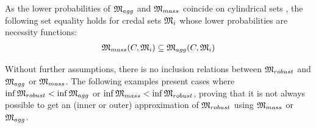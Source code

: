 As the lower probabilities of $\mathfrak{M}_{agg}$ and $\mathfrak{M}_{mass}$ coincide on cylindrical sets , the following set equality holds for credal sets $\mathfrak{M}_i$ whose lower probabilities are necessity functions:
\begin{eqnarray}\label{eq:inclusion_necessity}
    \mathfrak{M}_{mass}(C, \mathfrak{M}_i) \subseteq \mathfrak{M}_{agg}(C, \mathfrak{M}_i)
\end{eqnarray}

Without further assumptions, there is no inclusion relations between $\mathfrak{M}_{robust}$ and $\mathfrak{M}_{agg}$ or $\mathfrak{M}_{mass}$. The following examples present cases where $\inf\mathfrak{M}_{robust}<\inf\mathfrak{M}_{agg}$ or $\inf\mathfrak{M}_{mass}<\inf\mathfrak{M}_{robust}$, proving that it is not always possible to get an (inner or outer) approximation of $\mathfrak{M}_{robust}$ using $\mathfrak{M}_{mass}$ or $\mathfrak{M}_{agg}$.

